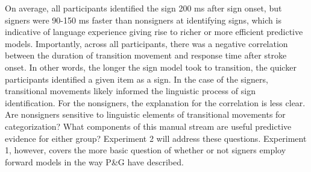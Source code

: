             On average, all participants identified the sign 200 ms after sign onset, but signers were 90-150 ms faster than nonsigners at identifying signs, which is indicative of language experience giving rise to richer or more efficient predictive models. Importantly, across all participants, there was a negative correlation between the duration of transition movement and response time after stroke onset. In other words, the longer the sign model took to transition, the quicker participants identified a given item as a sign. In the case of the signers, transitional movements likely informed the linguistic process of sign identification. For the nonsigners, the explanation for the correlation is less clear. Are nonsigners sensitive to linguistic elements of transitional movements for categorization? What components of this manual stream are useful predictive evidence for either group? Experiment 2 will address these questions. Experiment 1, however, covers the more basic question of whether or not signers employ forward models in the way P\&G have described.
